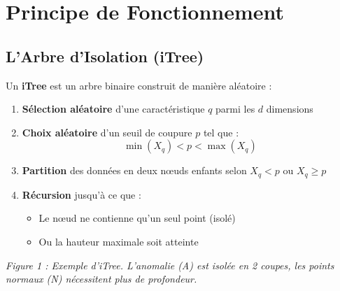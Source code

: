 \documentclass[a4paper,11pt]{article}
\begin{document}
\section{Principe de Fonctionnement}

\subsection{L'Arbre d'Isolation (iTree)}

Un \textbf{iTree} est un arbre binaire construit de manière aléatoire :

\begin{enumerate}
    \item \textbf{Sélection aléatoire} d'une caractéristique $q$ parmi les $d$ dimensions
    \item \textbf{Choix aléatoire} d'un seuil de coupure $p$ tel que :
    $$\min(X_q) < p < \max(X_q)$$
    \item \textbf{Partition} des données en deux nœuds enfants selon $X_q < p$ ou $X_q \geq p$
    \item \textbf{Récursion} jusqu'à ce que :
    \begin{itemize}
        \item Le nœud ne contienne qu'un seul point (isolé)
        \item Ou la hauteur maximale soit atteinte
    \end{itemize}
\end{enumerate}

\begin{center}

\textit{Figure 1 : Exemple d'iTree. L'anomalie (A) est isolée en 2 coupes, les points normaux (N) nécessitent plus de profondeur.}
\end{center}
\end{document}
